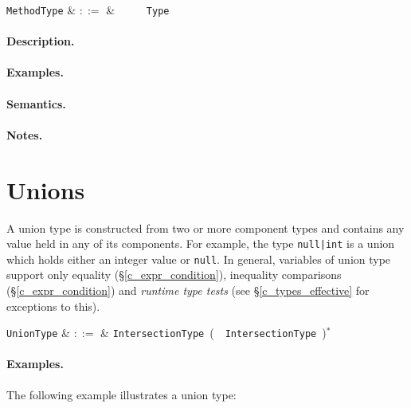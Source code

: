 \begin{syntax}
  \verb+MethodType+ & $::=$ & \ \token{(}\
  \ \token{)}\ \token{=>}\ \verb+Type+\\
\end{syntax}

\paragraph{Description.}  

\paragraph{Examples.}

\paragraph{Semantics.}

\paragraph{Notes.}


\section{Unions}
\label{c_types_unions}

A union type is constructed from two or more component types and contains any value held in any of its components.  For example, the type \lstinline{null|int} is a union which holds either an integer value or \lstinline{null}.  In general, variables of union type support only equality (\S\ref{c_expr_condition}), inequality comparisons (\S\ref{c_expr_condition}) and {\em runtime type tests} (see \S\ref{c_types_effective} for exceptions to this).

\begin{syntax}
  \verb+UnionType+ & $::=$ & \verb+IntersectionType+\ \big(\ \token{|}\ \verb+IntersectionType+\
  \big)$^*$\\
\end{syntax}

\paragraph{Examples.}  The following example illustrates a union type:


